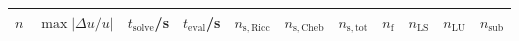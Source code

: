 \begin{tabular}{l c c c c c c c c c c}
\hline \hline 
$n$  &  $\max|\Delta u/u|$  &  $t_{\mathrm{solve}}$/\si{\s}  &  $t_{\mathrm{eval}}$/\si{\s}  &  $n_{\mathrm{s,Ricc}}$  &  $n_{\mathrm{s,Cheb}}$  &  $n_{\mathrm{s,tot}}$  &  $n_{\mathrm{f}}$  &  $n_{\mathrm{LS}}$  &  $n_{\mathrm{LU}}$  &  $n_{\mathrm{sub}}$ \\ \hline

\end{tabular}
